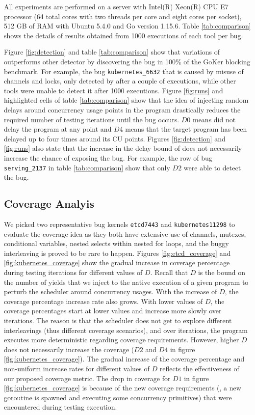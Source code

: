 All experiments are performed on a server with Intel(R) Xeon(R) CPU E7 processor (64 total cores with two threads per core and eight cores per socket), 512 GB of RAM with Ubuntu 5.4.0 and Go version 1.15.6.
%
Table \ref{tab:comparison} shows the details of results obtained from 1000 executions of each tool per bug.
%

%


%
Figure \ref{fig:detection} and table \ref{tab:comparison} show that variations of \goat outperforms other detector by discovering the bug in 100\% of the GoKer blocking benchmark.
%
For example, the bug \texttt{kubernetes\_6632} that is caused by misuse of channels and locks, only detected by \goat after a couple of executions, while other tools were unable to detect it after 1000 executions.
%
Figure \ref{fig:runs} and highlighted cells of table \ref{tab:comparison} show that the idea of injecting random delays around concurrency usage points in the program drastically reduces the required number of testing iterations until the bug occurs.
%
$D0$ means \goat did not delay the program at any point and $D4$ means that the target program has been delayed up to four times around its CU points.
%
Figures \ref{fig:detection} and \ref{fig:runs} also state that the increase in the delay bound of \goat does not necessarily increase the chance of exposing the bug.
%
For example, the row of bug \texttt{serving\_2137} in table \ref{tab:comparison} show that only \goat $D2$ were able to detect the bug.




\subsection{Coverage Analyis}
We picked two representative bug kernels \texttt{etcd7443} and \texttt{kubernetes11298} to evaluate the coverage idea as they both have extensive use of channels, mutexes, conditional variables, nested selects within nested for loops, and the buggy interleaving is proved to be rare to happen.
%
Figures \ref{fig:etcd_coverage} and \ref{fig:kubernetes_coverage} show the gradual increase in coverage percentage during testing iterations for different values of $D$.
%
Recall that $D$ is the bound on the number of yields that we inject to the native execution of a given program to perturb the scheduler around concurrency usages.
%
With the increase of $D$, the coverage percentage increase rate also grows.
%
With lower values of $D$, the coverage percentages start at lower values and increase more slowly over iterations.
%
The reason is that the scheduler does not get to explore different interleavings (thus different coverage scenarios), and over iterations, the program executes more deterministic regarding coverage requirements.
%
However, higher $D$ does not necessarily increase the coverage ($D2$ and $D4$ in figure \ref{fig:kubernetes_coverage}).
%
The gradual increase of the coverage percentage and non-uniform increase rates for different values of $D$ reflects the effectiveness of our proposed coverage metric.
%
The drop in coverage for $D1$ in figure \ref{fig:kubernetes_coverage} is because of the new coverage requirements (\eg, a new goroutine is spawned and executing some concurrency primitives) that were encountered during testing execution.
%
